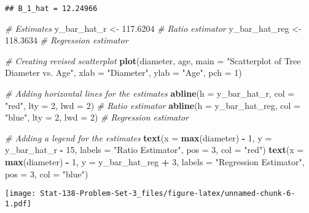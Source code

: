 \documentclass[
]{article}
\newenvironment{Shaded}{\begin{snugshade}}{\end{snugshade}}
\newcommand{\AttributeTok}[1]{\textcolor[rgb]{0.13,0.29,0.53}{#1}}
\newcommand{\CommentTok}[1]{\textcolor[rgb]{0.56,0.35,0.01}{\textit{#1}}}
\newcommand{\DecValTok}[1]{\textcolor[rgb]{0.00,0.00,0.81}{#1}}
\newcommand{\FloatTok}[1]{\textcolor[rgb]{0.00,0.00,0.81}{#1}}
\newcommand{\FunctionTok}[1]{\textcolor[rgb]{0.13,0.29,0.53}{\textbf{#1}}}
\newcommand{\NormalTok}[1]{#1}
\newcommand{\OtherTok}[1]{\textcolor[rgb]{0.56,0.35,0.01}{#1}}
\newcommand{\SpecialCharTok}[1]{\textcolor[rgb]{0.81,0.36,0.00}{\textbf{#1}}}
\newcommand{\StringTok}[1]{\textcolor[rgb]{0.31,0.60,0.02}{#1}}
\begin{document}
\begin{verbatim}
## B_1_hat = 12.24966
\end{verbatim}

\begin{Shaded}
\begin{Highlighting}[]
\CommentTok{\# Estimates}
\NormalTok{y\_bar\_hat\_r }\OtherTok{\textless{}{-}} \FloatTok{117.6204} \CommentTok{\# Ratio estimator}
\NormalTok{y\_bar\_hat\_reg }\OtherTok{\textless{}{-}} \FloatTok{118.3634} \CommentTok{\# Regression estimator}

\CommentTok{\# Creating revised scatterplot}
\FunctionTok{plot}\NormalTok{(diameter, age,}
     \AttributeTok{main =} \StringTok{"Scatterplot of Tree Diameter vs. Age"}\NormalTok{,}
     \AttributeTok{xlab =} \StringTok{"Diameter"}\NormalTok{,}
     \AttributeTok{ylab =} \StringTok{"Age"}\NormalTok{,}
     \AttributeTok{pch =} \DecValTok{1}\NormalTok{)}

\CommentTok{\# Adding horizontal lines for the estimates }
\FunctionTok{abline}\NormalTok{(}\AttributeTok{h =}\NormalTok{ y\_bar\_hat\_r, }\AttributeTok{col =} \StringTok{"red"}\NormalTok{, }\AttributeTok{lty =} \DecValTok{2}\NormalTok{, }\AttributeTok{lwd =} \DecValTok{2}\NormalTok{) }\CommentTok{\# Ratio estimator }
\FunctionTok{abline}\NormalTok{(}\AttributeTok{h =}\NormalTok{ y\_bar\_hat\_reg, }\AttributeTok{col =} \StringTok{"blue"}\NormalTok{, }\AttributeTok{lty =} \DecValTok{2}\NormalTok{, }\AttributeTok{lwd =} \DecValTok{2}\NormalTok{) }\CommentTok{\# Regression estimator}

\CommentTok{\# Adding a legend for the estimates}
\FunctionTok{text}\NormalTok{(}\AttributeTok{x =} \FunctionTok{max}\NormalTok{(diameter) }\SpecialCharTok{{-}} \DecValTok{1}\NormalTok{, }\AttributeTok{y =}\NormalTok{ y\_bar\_hat\_r }\SpecialCharTok{{-}} \DecValTok{15}\NormalTok{, }\AttributeTok{labels =} \StringTok{"Ratio Estimator"}\NormalTok{, }\AttributeTok{pos =} \DecValTok{3}\NormalTok{, }\AttributeTok{col =} \StringTok{"red"}\NormalTok{)}
\FunctionTok{text}\NormalTok{(}\AttributeTok{x =} \FunctionTok{max}\NormalTok{(diameter) }\SpecialCharTok{{-}} \DecValTok{1}\NormalTok{, }\AttributeTok{y =}\NormalTok{ y\_bar\_hat\_reg }\SpecialCharTok{+} \DecValTok{3}\NormalTok{, }\AttributeTok{labels =} \StringTok{"Regression Estimator"}\NormalTok{, }\AttributeTok{pos =} \DecValTok{3}\NormalTok{, }\AttributeTok{col =} \StringTok{"blue"}\NormalTok{)}
\end{Highlighting}
\end{Shaded}

\texttt{[image: Stat-138-Problem-Set-3\_files/figure-latex/unnamed-chunk-6-1.pdf]}
\end{document}
